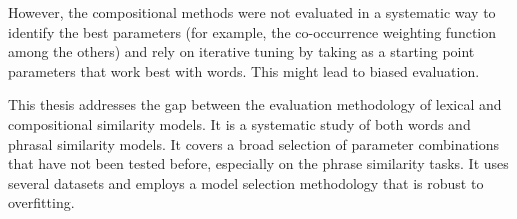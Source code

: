 However, the compositional methods were not evaluated in a systematic way to identify the best parameters (for example, the co-occurrence weighting function among the others) and rely on iterative tuning by taking as a starting point parameters that work best with words. This might lead to biased evaluation.

This thesis addresses the gap between the evaluation methodology of lexical and compositional similarity models. It is a systematic study of both words and phrasal similarity models. It covers a broad selection of parameter combinations that have not been tested before, especially on the phrase similarity tasks. It uses several datasets and employs a model selection methodology that is robust to overfitting.

